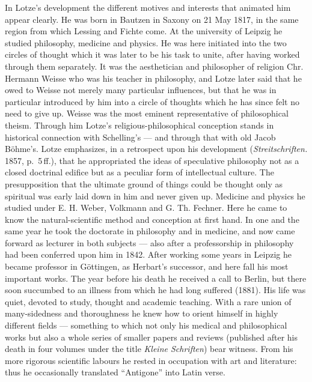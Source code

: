 \documentclass[12pt,a4paper]{book}
\newcommand{\opage}[1]{\marginnote{\footnotesize\textit{[#1]}}}
\begin{document}
In Lotze's development the different motives and interests that animated him
appear clearly. He was born in Bautzen in Saxony on 21 May 1817, in the same
region from which Lessing and Fichte come. At the university of Leipzig he
studied philosophy, medicine and physics. He was here initiated into the two
circles of thought which it was later to be his task to unite, after having
worked through them separately. It was the aesthetician and philosopher of
religion Chr. Hermann Weisse who was his teacher in philosophy, and Lotze later
said that he owed to Weisse not merely many particular influences, but that he
was in particular introduced by him into a circle of thoughts which he has since
felt no need to give up. Weisse was the most eminent representative of
philosophical theism. Through him Lotze's religious-philosophical conception
stands in historical connection with Schelling's --- and through that with old
Jacob Böhme's. Lotze emphasizes, in a retrospect upon his development
(\textit{Streitschriften.} \opage{511}1857, p.~5\,ff.), that he appropriated the ideas of
speculative philosophy not as a closed doctrinal edifice but as a peculiar form
of intellectual culture. The presupposition that the ultimate ground of things
could be thought only as spiritual was early laid down in him and never given
up. Medicine and physics he studied under E. H. Weber, Volkmann and G. Th.
Fechner. Here he came to know the natural-scientific method and conception at
first hand. In one and the same year he took the doctorate in philosophy and in
medicine, and now came forward as lecturer in both subjects --- also after a
professorship in philosophy had been conferred upon him in 1842. After working
some years in Leipzig he became professor in Göttingen, as Herbart's successor,
and here fall his most important works. The year before his death he received a
call to Berlin, but there soon succumbed to an illness from which he had long
suffered (1881). His life was quiet, devoted to study, thought and academic
teaching. With a rare union of many-sidedness and thoroughness he knew how to
orient himself in highly different fields --- something to which not only his
medical and philosophical works but also a whole series of smaller papers and
reviews (published after his death in four volumes under the title \textit{Kleine
Schriften}) bear witness. From his more rigorous scientific labours he rested in
occupation with art and literature: thus he occasionally translated ``Antigone''
into Latin verse.
\end{document}
